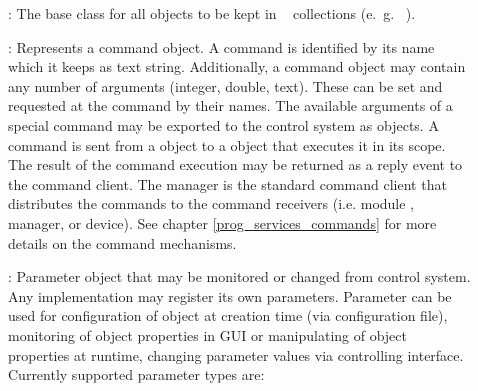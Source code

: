\begin{description}

\item[] :  The base class for all objects to be kept in \dabc~ collections (e.~g.~ ).

\item[] : 
Represents a command object. A command 
   is identified by its name which it keeps as text string. Additionally, 
   a command object may contain any number of arguments (integer, double, text). 
   These can be set and requested at the command by their names. 
   The available arguments of a special command may be exported to the control 
   system as  objects. A command is sent from a 
    object to a  object
    that executes it in its scope. 
   The result of the command execution may be returned as a reply event to 
   the command client. The manager is the standard command client 
   that distributes the commands to the command receivers 
   (i.e. module , manager, or device). See chapter \ref{prog_services_commands}
   for more details on the command mechanisms.

\item[] :   
Parameter object that may be monitored or 
   changed from control system. Any  implementation 
   may register its own parameters. Parameter can be used for configuration of object 
   at creation time (via configuration file), monitoring of object properties in GUI or
   manipulating of object properties at runtime, changing parameter values via controlling 
   interface.  Currently supported parameter types are:


\end{description}
